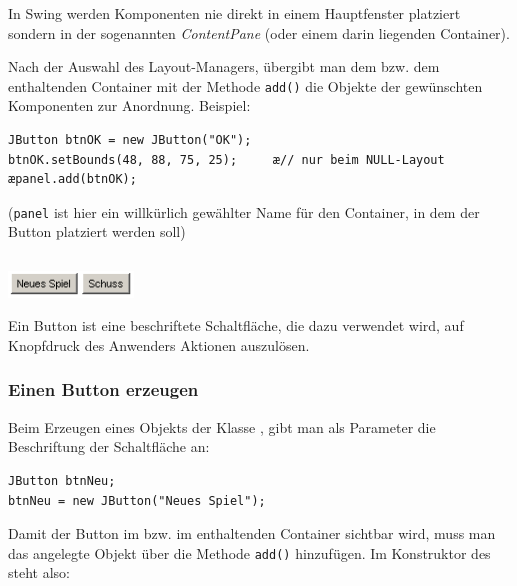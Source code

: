 In Swing werden Komponenten nie direkt in einem Hauptfenster platziert sondern
in der sogenannten \emph{ContentPane} (oder einem darin liegenden Container).

Nach der Auswahl des Layout-Managers, übergibt man dem  bzw. dem
enthaltenden Container mit der Methode \lstinline|add()| die Objekte der
gewünschten Komponenten zur Anordnung. Beispiel:

\begin{lstlisting}
JButton btnOK = new JButton("OK"); 
btnOK.setBounds(48, 88, 75, 25);     æ// nur beim NULL-Layout
æpanel.add(btnOK);
\end{lstlisting}

(\lstinline|panel| ist hier ein willkürlich gewählter Name für den Container, in
dem der Button platziert werden soll)

\begin{minipage}{0.2\textwidth}
\subsection{}
\end{minipage}
\begin{minipage}{0.8\textwidth}
\includegraphics[width=0.25\textwidth]{./inf/SEKII/24_Java_GUI-Komponenten/JButton.png}
\end{minipage}

Ein Button ist eine beschriftete Schaltfläche, die dazu verwendet wird, auf
Knopfdruck des Anwenders Aktionen auszulösen.

\subsubsection{Einen Button erzeugen}

Beim Erzeugen eines Objekts der Klasse , gibt man als Parameter
die Beschriftung der Schaltfläche an:

\begin{lstlisting}
JButton btnNeu;
btnNeu = new JButton("Neues Spiel");
\end{lstlisting}

Damit der Button im  bzw. im enthaltenden Container sichtbar
wird, muss man das angelegte Objekt über die Methode \lstinline|add()|
hinzufügen. Im Konstruktor des  steht also:

